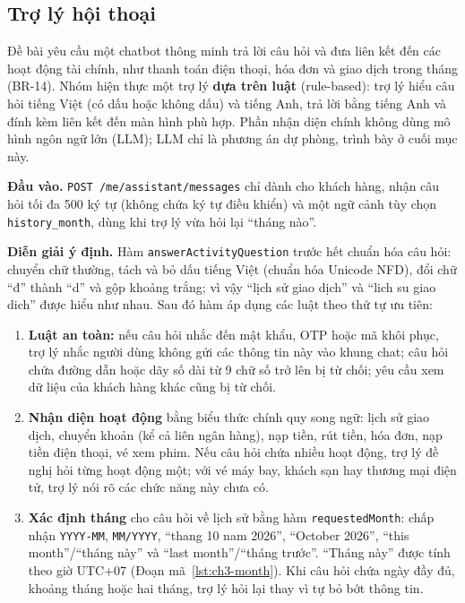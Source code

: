 \subsection{Trợ lý hội thoại}
\label{sec:ch3-assistant}

Đề bài yêu cầu một chatbot thông minh trả lời câu hỏi và đưa liên kết đến các hoạt động tài chính, như thanh toán điện thoại, hóa đơn và giao dịch trong tháng (BR-14). Nhóm hiện thực một trợ lý \textbf{dựa trên luật} (rule-based): trợ lý hiểu câu hỏi tiếng Việt (có dấu hoặc không dấu) và tiếng Anh, trả lời bằng tiếng Anh và đính kèm liên kết đến màn hình phù hợp. Phần nhận diện chính không dùng mô hình ngôn ngữ lớn (LLM); LLM chỉ là phương án dự phòng, trình bày ở cuối mục này.

\textbf{Đầu vào.} \texttt{POST /\allowbreak{}me/\allowbreak{}assistant/\allowbreak{}messages} chỉ dành cho khách hàng, nhận câu hỏi tối đa 500 ký tự (không chứa ký tự điều khiển) và một ngữ cảnh tùy chọn \texttt{history\_\allowbreak{}month}, dùng khi trợ lý vừa hỏi lại ``tháng nào''.

\textbf{Diễn giải ý định.} Hàm \texttt{answer\allowbreak{}Activity\allowbreak{}Question} trước hết chuẩn hóa câu hỏi: chuyển chữ thường, tách và bỏ dấu tiếng Việt (chuẩn hóa Unicode NFD), đổi chữ ``đ'' thành ``d'' và gộp khoảng trắng; vì vậy ``lịch sử giao dịch'' và ``lich su giao dich'' được hiểu như nhau. Sau đó hàm áp dụng các luật theo thứ tự ưu tiên:
\begin{enumerate}
	\item \textbf{Luật an toàn:} nếu câu hỏi nhắc đến mật khẩu, OTP hoặc mã khôi phục, trợ lý nhắc người dùng không gửi các thông tin này vào khung chat; câu hỏi chứa đường dẫn hoặc dãy số dài từ 9 chữ số trở lên bị từ chối; yêu cầu xem dữ liệu của khách hàng khác cũng bị từ chối.
	\item \textbf{Nhận diện hoạt động} bằng biểu thức chính quy song ngữ: lịch sử giao dịch, chuyển khoản (kể cả liên ngân hàng), nạp tiền, rút tiền, hóa đơn, nạp tiền điện thoại, vé xem phim. Nếu câu hỏi chứa nhiều hoạt động, trợ lý đề nghị hỏi từng hoạt động một; với vé máy bay, khách sạn hay thương mại điện tử, trợ lý nói rõ các chức năng này chưa có.
	\item \textbf{Xác định tháng} cho câu hỏi về lịch sử bằng hàm \texttt{requested\allowbreak{}Month}: chấp nhận \texttt{YYYY-\allowbreak{}MM}, \texttt{MM/\allowbreak{}YYYY}, ``thang 10 nam 2026'', ``October 2026'', ``this month''/``tháng này'' và ``last month''/``tháng trước''. ``Tháng này'' được tính theo giờ UTC+07 (Đoạn mã~\ref{lst:ch3-month}). Khi câu hỏi chứa ngày đầy đủ, khoảng tháng hoặc hai tháng, trợ lý hỏi lại thay vì tự bỏ bớt thông tin.
\end{enumerate}

